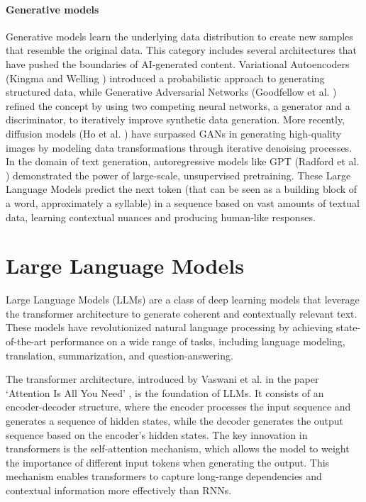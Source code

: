 \paragraph{Generative models}
Generative models learn the underlying data distribution to create new samples
that resemble the original data. This category includes several architectures that
have pushed the boundaries of AI-generated content. Variational Autoencoders (Kingma
and Welling \cite{kingma2022autoencodingvariationalbayes}) introduced a
probabilistic approach to generating structured data, while Generative Adversarial
Networks (Goodfellow et al. \cite{goodfellow2014generativeadversarialnetworks})
refined the concept by using two competing neural networks, a generator and a discriminator,
to iteratively improve synthetic data generation. More recently, diffusion
models (Ho et al. \cite{ho2020denoisingdiffusionprobabilisticmodels}) have surpassed
GANs in generating high-quality images by modeling data transformations through iterative
denoising processes. In the domain of text generation, autoregressive models like
GPT (Radford et al. \cite{radford2018improving}) demonstrated the power of large-scale,
unsupervised pretraining. These Large Language Models predict the next token (that
can be seen as a building block of a word, approximately a syllable) in a sequence
based on vast amounts of textual data, learning contextual nuances and producing
human-like responses.

\section{Large Language Models}
\label{sec:large_language_models_llms}

Large Language Models (LLMs) are a class of deep learning models that leverage the
transformer architecture to generate coherent and contextually relevant text.
These models have revolutionized natural language processing by achieving state-of-the-art
performance on a wide range of tasks, including language modeling, translation, summarization,
and question-answering.

The transformer architecture, introduced by Vaswani et al. in the paper `Attention
Is All You Need' \cite{vaswani2023attentionneed}, is the foundation of LLMs. It
consists of an encoder-decoder structure, where the encoder processes the input sequence
and generates a sequence of hidden states, while the decoder generates the
output sequence based on the encoder's hidden states. The key innovation in transformers
is the self-attention mechanism, which allows the model to weight the importance
of different input tokens when generating the output. This mechanism enables transformers
to capture long-range dependencies and contextual information more effectively than
RNNs.

